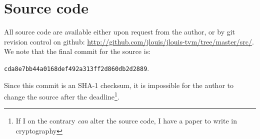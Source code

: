 \documentclass[a4paper, oneside, 10pt, draft]{memoir}
\begin{document}


\appendix
\chapter{Source code}
All source code are available either upon request from the author, or
by git revision control on github:
\url{http://github.com/jlouis/jlouis-tvm/tree/master/src/}. We note
that the final commit for the source is:
\begin{center}
  \texttt{cda8e7bb44a0168def492a313ff2d860db2d2889}.
\end{center}
Since this commit is an SHA-1 checksum, it is impossible for the
author to change the source after the deadline\footnote{If I on the
  contrary \emph{can} alter the source code, I have a paper to write
  in cryptography}.

% 
% 
% 
% 
% 
% 
% 
\end{document}
